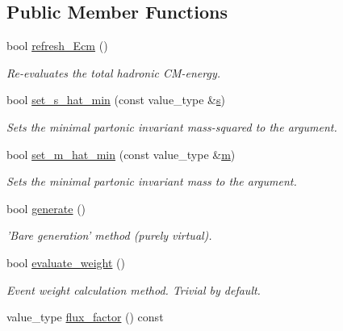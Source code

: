 \subsection*{Public Member Functions}
\begin{DoxyCompactItemize}
\item 
\hypertarget{a00255_a0660be3ee1baa2f0cfdef7c4204743f4}{bool \hyperlink{a00255_a0660be3ee1baa2f0cfdef7c4204743f4}{refresh\-\_\-\-Ecm} ()}\label{a00255_a0660be3ee1baa2f0cfdef7c4204743f4}

\begin{DoxyCompactList}\small\item\em Re-\/evaluates the total hadronic C\-M-\/energy. \end{DoxyCompactList}\item 
\hypertarget{a00255_a5980930205dfaaeddb34719541a2018c}{bool \hyperlink{a00255_a5980930205dfaaeddb34719541a2018c}{set\-\_\-s\-\_\-hat\-\_\-min} (const value\-\_\-type \&\hyperlink{a00304_ae2984255cbdaabc293b8168d93c767bf}{s})}\label{a00255_a5980930205dfaaeddb34719541a2018c}

\begin{DoxyCompactList}\small\item\em Sets the minimal partonic invariant mass-\/squared to the argument. \end{DoxyCompactList}\item 
\hypertarget{a00255_a88cc3f829804e6624e95de9bac2c17b0}{bool \hyperlink{a00255_a88cc3f829804e6624e95de9bac2c17b0}{set\-\_\-m\-\_\-hat\-\_\-min} (const value\-\_\-type \&\hyperlink{a00304_a2a95cea4e7fd1e59bf96fed7225afdf2}{m})}\label{a00255_a88cc3f829804e6624e95de9bac2c17b0}

\begin{DoxyCompactList}\small\item\em Sets the minimal partonic invariant mass to the argument. \end{DoxyCompactList}\item 
bool \hyperlink{a00255_a98f349a841c9177ead3c3d84d4262eee}{generate} ()
\begin{DoxyCompactList}\small\item\em 'Bare generation' method (purely virtual). \end{DoxyCompactList}\item 
\hypertarget{a00255_a5557622ee98578b1f93d7d9c312c5416}{bool \hyperlink{a00255_a5557622ee98578b1f93d7d9c312c5416}{evaluate\-\_\-weight} ()}\label{a00255_a5557622ee98578b1f93d7d9c312c5416}

\begin{DoxyCompactList}\small\item\em Event weight calculation method. Trivial by default. \end{DoxyCompactList}\item 
\hypertarget{a00255_adc018439680f98e95fd4330c8d384fc6}{value\-\_\-type \hyperlink{a00255_adc018439680f98e95fd4330c8d384fc6}{flux\-\_\-factor} () const }\label{a00255_adc018439680f98e95fd4330c8d384fc6}


\end{DoxyCompactItemize}
